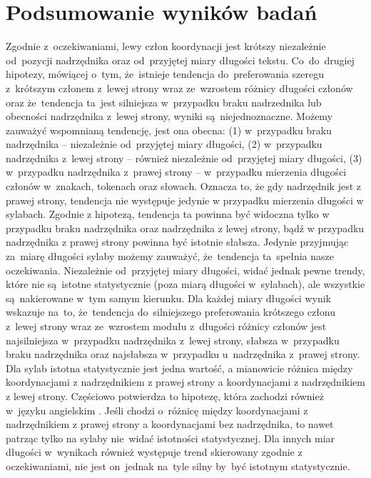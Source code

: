 \documentclass[licencjacka]{pracamgr_Kogni}
\begin{document}
    \section{Podsumowanie wyników badań}\label{sec:podsumowanie-wynikow-badan}
    Zgodnie z~oczekiwaniami, lewy człon koordynacji jest krótszy niezależnie od~pozycji nadrzędnika oraz od~przyjętej miary długości tekstu.
    Co~do~drugiej hipotezy, mówiącej o~tym, że~istnieje tendencja do~preferowania szeregu z~krótszym członem z~lewej strony wraz ze~wzrostem różnicy długości członów oraz że~tendencja ta~jest silniejsza w~przypadku braku nadrzednika lub obecności nadrzędnika z~lewej strony, wyniki są~niejednoznaczne.
    Możemy zauważyć wspomnianą tendencję, jest ona obecna: (1) w~przypadku braku nadrzędnika -- niezależnie od~przyjętej miary długości, (2) w~przypadku nadrzędnika z~lewej strony -- również niezależnie od~przyjętej miary długości, (3) w~przypadku nadrzędnika z~prawej strony -- w~przypadku mierzenia długości członów w~znakach, tokenach oraz słowach. 
    Oznacza to, że gdy nadrzędnik jest z prawej strony, tendencja nie występuje jedynie w przypadku mierzenia długości w sylabach.
    Zgodnie z hipotezą, tendencja ta powinna być widoczna tylko w przypadku braku nadrzędnika oraz nadrzędnika z lewej strony, bądź w przypadku nadrzędnika z prawej strony powinna być istotnie słabsza.
    Jedynie przyjmując za~miarę długości sylaby możemy zauważyć, że~tendencja ta~spełnia nasze oczekiwania.
    Niezależnie od~przyjętej miary długości, widać jednak pewne trendy, które nie są~istotne statystycznie (poza miarą długości w~sylabach), ale wszystkie są~nakierowane w~tym samym kierunku.
    Dla każdej miary długości wynik wskazuje na~to, że~tendencja do~silniejszego preferowania krótszego członu z~lewej strony wraz ze~wzrostem modułu z~długości różnicy członów jest najsilniejsza w~przypadku nadrzędnika z~lewej strony, słabsza w~przypadku braku nadrzędnika oraz najsłabsza w~przypadku u~nadrzędnika z~prawej strony.
    Dla sylab istotna statystycznie jest jedna wartość, a mianowicie różnica między koordynacjami z nadrzędnikiem z prawej strony a koordynacjami z nadrzędnikiem z lewej strony.
    Częściowo potwierdza to hipotezę, która zachodzi również w~języku angielskim \citep{Przepiorkowski2023}.
    Jeśli chodzi o~różnicę między koordynacjami z nadrzędnikiem z prawej strony a koordynacjami bez nadrzędnika, to nawet patrząc tylko na sylaby nie~widać istotności statystycznej.
    Dla innych miar długości w~wynikach również występuje trend skierowany zgodnie z oczekiwaniami, nie jest on~jednak na~tyle silny by~być istotnym statystycznie.
    
\end{document}
